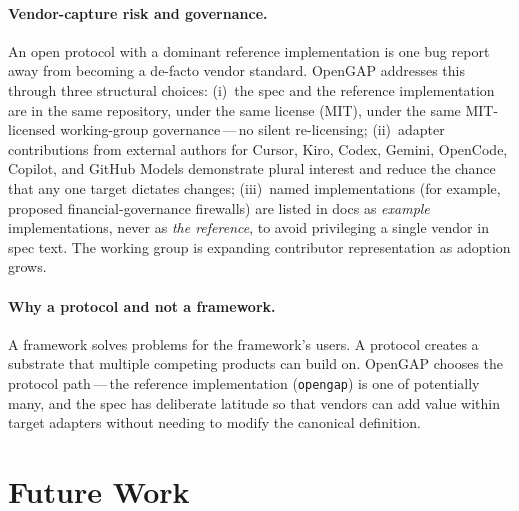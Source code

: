 \documentclass[11pt,a4paper]{article}
\begin{document}
\paragraph{Vendor-capture risk and governance.}
An open protocol with a dominant reference implementation is one bug report away from
becoming a de-facto vendor standard. OpenGAP addresses this through three structural
choices: (i)~the spec and the reference implementation are in the same repository,
under the same license (MIT), under the same MIT-licensed working-group
governance\,---\,no silent re-licensing; (ii)~adapter contributions from external
authors for Cursor, Kiro, Codex, Gemini, OpenCode, Copilot, and GitHub Models
demonstrate plural interest and reduce the chance that any one target dictates
changes; (iii)~named implementations (for example, proposed financial-governance
firewalls) are listed in docs as \emph{example} implementations, never as \emph{the
reference}, to avoid privileging a single vendor in spec text. The working group is
expanding contributor representation as adoption grows.

\paragraph{Why a protocol and not a framework.}
A framework solves problems for the framework's users. A protocol creates a substrate
that multiple competing products can build on. OpenGAP chooses the protocol
path\,---\,the reference implementation (\texttt{opengap}) is one of potentially many,
and the spec has deliberate latitude so that vendors can add value within target
adapters without needing to modify the canonical definition.

\section{Future Work}\label{sec:future}
\end{document}
